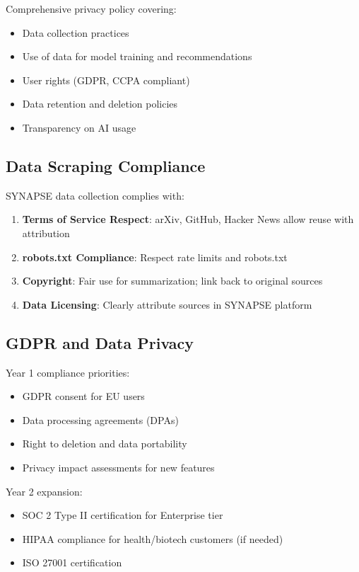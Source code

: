 \documentclass{report}
\begin{document}
Comprehensive privacy policy covering:
\begin{itemize}
    \item Data collection practices
    \item Use of data for model training and recommendations
    \item User rights (GDPR, CCPA compliant)
    \item Data retention and deletion policies
    \item Transparency on AI usage
\end{itemize}

\subsection{Data Scraping Compliance}

SYNAPSE data collection complies with:
\begin{enumerate}
    \item \textbf{Terms of Service Respect}: arXiv, GitHub, Hacker News allow reuse with attribution
    \item \textbf{robots.txt Compliance}: Respect rate limits and robots.txt
    \item \textbf{Copyright}: Fair use for summarization; link back to original sources
    \item \textbf{Data Licensing}: Clearly attribute sources in SYNAPSE platform
\end{enumerate}

\subsection{GDPR and Data Privacy}

Year 1 compliance priorities:
\begin{itemize}
    \item GDPR consent for EU users
    \item Data processing agreements (DPAs)
    \item Right to deletion and data portability
    \item Privacy impact assessments for new features
\end{itemize}

Year 2 expansion:
\begin{itemize}
    \item SOC 2 Type II certification for Enterprise tier
    \item HIPAA compliance for health/biotech customers (if needed)
    \item ISO 27001 certification
\end{itemize}
\end{document}
